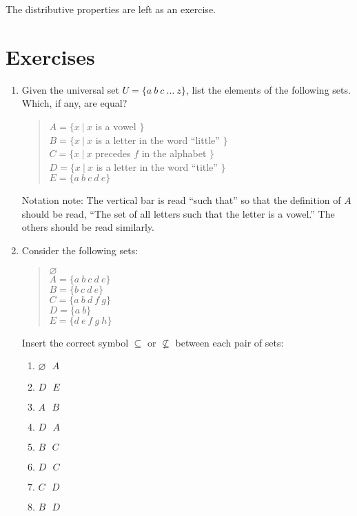 \documentclass[letterpaper,12pt,openany,reqno]{book}%
\begin{document}
The distributive properties are left as an exercise.

\section{Exercises}
\begin{enumerate}
\item Given the universal set $U = \{ a \ b \ c \  \ldots \ z\}$, list the elements of the following sets. Which, if any, are equal?

\begin{quote}
$A = \{x \ | \  x $ is a vowel $\}$\\
$B = \{x \ | \  x $ is a letter in the word ``little'' $\}$\\
$C = \{x \ | \  x $ precedes $f$ in the alphabet $\}$\\
$D = \{x \ | \  x $ is a letter in the word ``title'' $\}$\\
$E = \{a \ b \ c \ d \ e\}$\\
\end{quote}
Notation note: The vertical bar is read ``such that'' so that the definition of $A$ should be read, ``The set of all letters such that the letter is a vowel.'' The others should be read similarly.

\item Consider the following sets:
\begin{quote}
$\varnothing$\\
$A = \{a \ b \ c \ d \ e\}$\\
$B = \{b \ c \ d \ e\}$\\
$C = \{a \ b \ d \ f \ g\}$\\
$D = \{a \ b \}$\\
$E = \{d \ e \ f \ g \ h\}$\\
\end{quote}
Insert the correct symbol $\subseteq$ or $\not \subseteq$ between each pair of sets:
\begin{enumerate}
\item $\varnothing \ \ \ A$
\item $D \ \ \ E$
\item $A \ \ \ B$
\item $D \ \ \ A$
\item $B \ \ \ C$
\item $D \ \ \ C$
\item $C \ \ \ D$
\item $B \ \ \ D$
\end{enumerate}


\end{enumerate}
\end{document}
